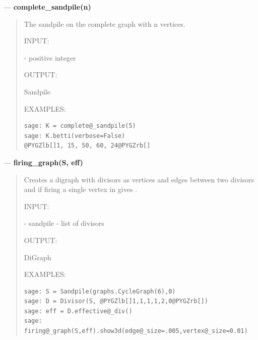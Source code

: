 \documentclass[letterpaper,10pt,english]{manual}
\begin{document}
---
\hypertarget{complete-sandpile-n}{}
\textbf{complete\_sandpile(n)}
\begin{quote}

The sandpile on the complete graph with n vertices.

INPUT:

 - positive integer

OUTPUT:

Sandpile

EXAMPLES:

\begin{Verbatim}[commandchars=@\[\]]
sage: K = complete@_sandpile(5)
sage: K.betti(verbose=False)
@PYGZlb[]1, 15, 50, 60, 24@PYGZrb[]
\end{Verbatim}
\end{quote}

---
\hypertarget{firing-graph-s-eff}{}
\textbf{firing\_graph(S, eff)}
\begin{quote}

Creates a digraph with divisors as vertices and edges between two
divisors  and  if firing a single vertex in  gives
.

INPUT:

 - sandpile
 - list of divisors

OUTPUT:

DiGraph

EXAMPLES:

\begin{Verbatim}[commandchars=@\[\]]
sage: S = Sandpile(graphs.CycleGraph(6),0)
sage: D = Divisor(S, @PYGZlb[]1,1,1,1,2,0@PYGZrb[])
sage: eff = D.effective@_div()
sage: firing@_graph(S,eff).show3d(edge@_size=.005,vertex@_size=0.01)
\end{Verbatim}
\end{quote}
\end{document}

